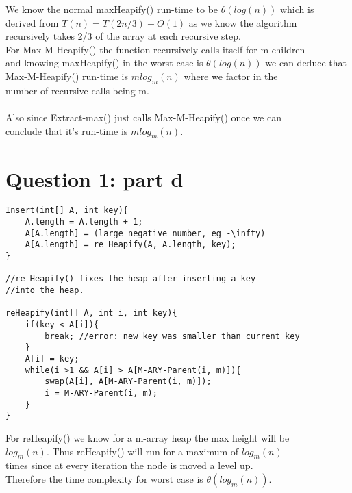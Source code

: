 \documentclass{article}
\begin{document}
We know the normal maxHeapify() run-time to be $\theta(log(n))$ which is 
\\derived from $T(n) = T(2n/3) + O(1)$ as we know the algorithm
\\recursively takes 2/3 of the array at each recursive step.
\\For Max-M-Heapify() the function recursively calls itself for m children
\\and knowing maxHeapify() in the worst case is $\theta(log(n))$ we can deduce that 
\\Max-M-Heapify() run-time is $mlog_{m}(n)$ where we factor in the
\\number of recursive calls being m.
\\
\\Also since Extract-max() just calls Max-M-Heapify() once we can 
\\conclude that it's run-time is $mlog_{m}(n)$.
\\
\section{Question 1: part d}
\begin{lstlisting}
Insert(int[] A, int key){                               
    A.length = A.length + 1;                            
    A[A.length] = (large negative number, eg -\infty)   
    A[A.length] = re_Heapify(A, A.length, key);         
}

//re-Heapify() fixes the heap after inserting a key
//into the heap.

reHeapify(int[] A, int i, int key){
    if(key < A[i]){
        break; //error: new key was smaller than current key
    }
    A[i] = key;
    while(i >1 && A[i] > A[M-ARY-Parent(i, m)]){
        swap(A[i], A[M-ARY-Parent(i, m)]);
        i = M-ARY-Parent(i, m);
    }
}
\end{lstlisting}
For reHeapify() we know for a m-array heap the max height will be
\\$log_{m}(n)$. Thus reHeapify() will run for a maximum of $log_{m}(n)$
\\times since at every iteration the node is moved a level up.
\\Therefore the time complexity for worst case is $\theta(log_{m}(n))$.
\end{document}

